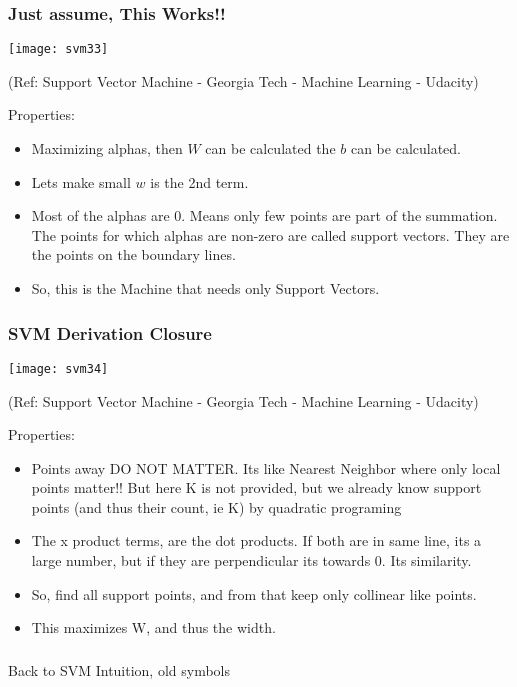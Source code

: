 \begin{frame}[fragile] \frametitle{Just assume, This Works!!}
\begin{center}
\texttt{[image: svm33]}

\tiny{(Ref: Support Vector Machine - Georgia Tech - Machine Learning - Udacity)}
\end{center}

Properties:
\begin{itemize}
\item Maximizing alphas, then $W$ can be calculated the $b$ can be calculated.
\item Lets make small $w$ is the 2nd term.
\item Most of the alphas are 0. Means only few points are part of the summation. The points for which alphas are non-zero are called support vectors. They are the points on the boundary lines.
\item So, this is the Machine that needs only Support Vectors.
\end{itemize}
\end{frame}

\begin{frame}[fragile] \frametitle{SVM Derivation Closure}
\begin{center}
\texttt{[image: svm34]}

\tiny{(Ref: Support Vector Machine - Georgia Tech - Machine Learning - Udacity)}
\end{center}

Properties:
\begin{itemize}
\item Points away DO NOT MATTER. Its like Nearest Neighbor where only local points matter!! But here K is not provided, but we already know support points (and thus their count, ie K) by quadratic programing
\item The x product terms, are the dot products. If both are in same line, its a large number, but if they are perpendicular its towards 0. Its similarity.
\item So, find all support points, and from that keep only collinear like points.
\item This maximizes W, and thus the width.
\end{itemize}
\end{frame}


\begin{frame}[fragile]\frametitle{}
\begin{center}
{\Large Back to SVM Intuition, old symbols}
\end{center}
\end{frame}


